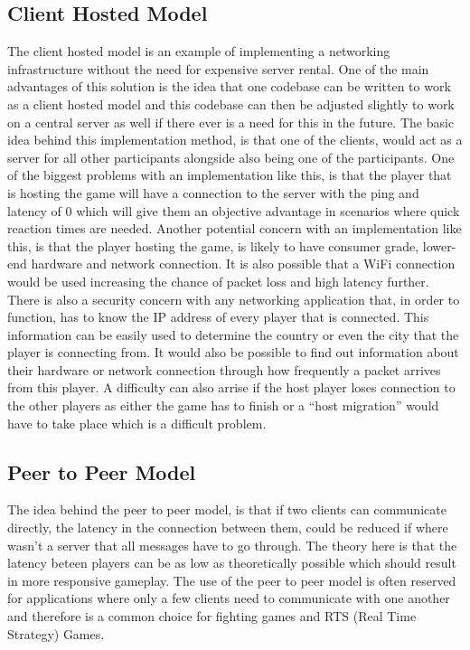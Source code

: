 


\subsection{Client Hosted Model}
The client hosted model is an example of implementing a networking infrastructure without the need for expensive server rental. One of the main advantages of this solution is the idea that one codebase can be written to work as a client hosted model and this codebase can then be adjusted slightly to work on a central server as well if there ever is a need for this in the future. The basic idea behind this implementation method, is that one of the clients, would act as a server for all other participants alongside also being one of the participants. One of the biggest problems with an implementation like this, is that the player that is hosting the game will have a connection to the server with the ping and latency of 0 which will give them an objective advantage in scenarios where quick reaction times are needed. Another potential concern with an implementation like this, is that the player hosting the game, is likely to have consumer grade, lower-end hardware and network connection. It is also possible that a WiFi connection would be used increasing the chance of packet loss and high latency further. There is also a security concern with any networking application that, in order to function, has to know the IP address of every player that is connected. This information can be easily used to determine the country or even the city that the player is connecting from. It would also be possible to find out information about their hardware or network connection through how frequently a packet arrives from this player. A difficulty can also arrise if the host player loses connection to the other players as either the game has to finish or a ``host migration'' would have to take place which is a difficult problem.




\subsection{Peer to Peer Model}
The idea behind the peer to peer model, is that if two clients can communicate directly, the latency in the connection between them, could be reduced if where wasn't a server that all messages have to go through. The theory here is that the latency beteen players can be as low as theoretically possible which should result in more responsive gameplay. The use of the peer to peer model is often reserved for applications where only a few clients need to communicate with one another and therefore is a common choice for fighting games and RTS (Real Time Strategy) Games.

